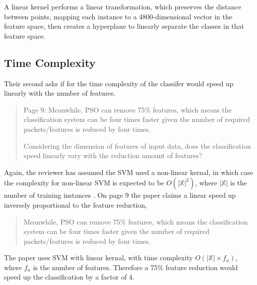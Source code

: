 \documentclass[runningheads]{llncs}
\begin{document}
A linear kernel performs a linear transformation, which preserves the distance between points, mapping each instance to a 4800-dimensional vector in the feature space, then creates a hyperplane to linearly separate the classes in that feature space.

\subsection{Time Complexity}

Their second asks if for the time complexity of the classifer would speed up linearly with the number of features. 

\begin{quote}
  Page 9: Meanwhile, PSO can remove 75\% features, which means the classification system can be four times faster given the number of required packets/features is reduced by four times.

  Considering the dimension of features of input data, does the classification speed linearly vary with the reduction amount of features?
\end{quote}

Again, the reviewer has assumed the SVM used a non-linear kernal, in which case the complexity for non-linear SVM is expected to be $O(|\mathbb{X}|^2)$, where $|\mathbb{X}|$ is the number of training instances \cite{chang2011libsvm}. On page 9 the paper claims a linear speed up inversely proportional to the feature reduction, 

\begin{quote}
  Meanwhile, PSO can remove 75\% features, which means the classification system can be four times faster given the number of required packets/features is reduced by four times. 
\end{quote}

The paper uses SVM with linear kernal, with time complexity $O(|\mathbb{X}| \times f_n)$, where $f_n$ is the number of features. Therefore a 75\% feature reduction would speed up the classification by a factor of 4. 


% 

\end{document}
